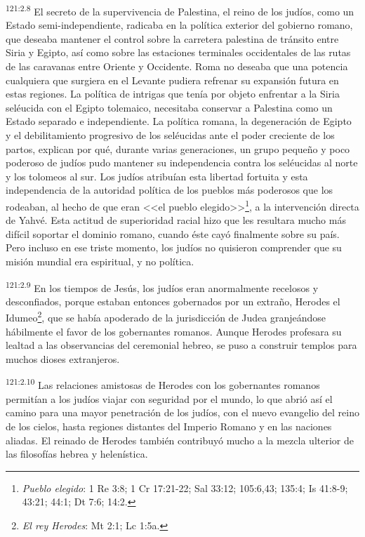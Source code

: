 \par 
\textsuperscript{121:2.8} El secreto de la supervivencia de Palestina, el reino de los judíos, como un Estado semi-independiente, radicaba en la política exterior del gobierno romano, que deseaba mantener el control sobre la carretera palestina de tránsito entre Siria y Egipto, así como sobre las estaciones terminales occidentales de las rutas de las caravanas entre Oriente y Occidente. Roma no deseaba que una potencia cualquiera que surgiera en el Levante pudiera refrenar su expansión futura en estas regiones. La política de intrigas que tenía por objeto enfrentar a la Siria seléucida con el Egipto tolemaico, necesitaba conservar a Palestina como un Estado separado e independiente. La política romana, la degeneración de Egipto y el debilitamiento progresivo de los seléucidas ante el poder creciente de los partos, explican por qué, durante varias generaciones, un grupo pequeño y poco poderoso de judíos pudo mantener su independencia contra los seléucidas al norte y los tolomeos al sur. Los judíos atribuían esta libertad fortuita y esta independencia de la autoridad política de los pueblos más poderosos que los rodeaban, al hecho de que eran <<el pueblo elegido>>\footnote{\textit{Pueblo elegido}: 1 Re 3:8; 1 Cr 17:21-22; Sal 33:12; 105:6,43; 135:4; Is 41:8-9; 43:21; 44:1; Dt 7:6; 14:2.}, a la intervención directa de Yahvé. Esta actitud de superioridad racial hizo que les resultara mucho más difícil soportar el dominio romano, cuando éste cayó finalmente sobre su país. Pero incluso en ese triste momento, los judíos no quisieron comprender que su misión mundial era espiritual, y no política.

\par 
\textsuperscript{121:2.9} En los tiempos de Jesús, los judíos eran anormalmente recelosos y desconfiados, porque estaban entonces gobernados por un extraño, Herodes el Idumeo\footnote{\textit{El rey Herodes}: Mt 2:1; Lc 1:5a.}, que se había apoderado de la jurisdicción de Judea granjeándose hábilmente el favor de los gobernantes romanos. Aunque Herodes profesara su lealtad a las observancias del ceremonial hebreo, se puso a construir templos para muchos dioses extranjeros.

\par 
\textsuperscript{121:2.10} Las relaciones amistosas de Herodes con los gobernantes romanos permitían a los judíos viajar con seguridad por el mundo, lo que abrió así el camino para una mayor penetración de los judíos, con el nuevo evangelio del reino de los cielos, hasta regiones distantes del Imperio Romano y en las naciones aliadas. El reinado de Herodes también contribuyó mucho a la mezcla ulterior de las filosofías hebrea y helenística.

